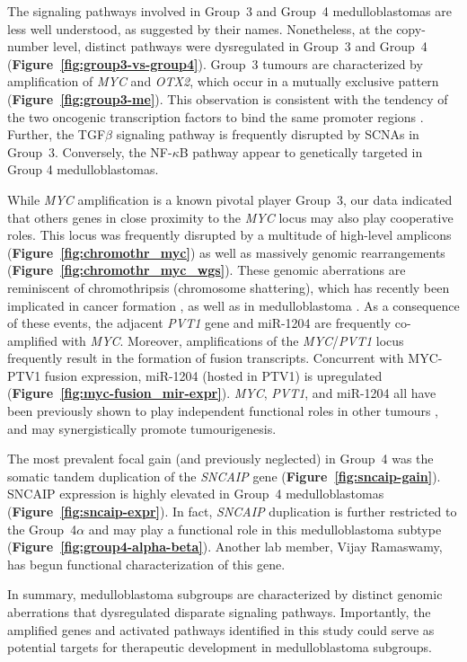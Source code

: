 \documentclass[11pt,letterpaper]{article}
\theoremstyle{definition}
\newcommand{\emphlab}[1]{\textbf{\textsf{#1}}}
\newcommand{\citefig}[1]{\emphlab{Figure~\ref{fig:#1}}}
\begin{document}
The signaling pathways involved in Group~3 and Group~4 medulloblastomas are less well understood, as suggested by their names. Nonetheless, at the copy-number level, distinct pathways were dysregulated in Group~3 and Group~4 (\citefig{group3-vs-group4}). Group~3 tumours are characterized by amplification of \emph{MYC} and \emph{OTX2}, which occur in a mutually exclusive pattern (\citefig{group3-me}). This observation is consistent with the tendency of the two oncogenic transcription factors to bind the same promoter regions . Further, the TGF$\beta$ signaling pathway is frequently disrupted by SCNAs in Group~3. Conversely, the NF-$\kappa$B pathway appear to genetically targeted in Group 4 medulloblastomas.

While \emph{MYC} amplification is a known pivotal player Group~3, our data indicated that others genes in close proximity to the \emph{MYC} locus may also play cooperative roles. This locus was frequently disrupted by a multitude of high-level amplicons (\citefig{chromothr_myc}) as well as massively genomic rearrangements (\citefig{chromothr_myc_wgs}). These genomic aberrations are reminiscent of chromothripsis (chromosome shattering), which has recently been implicated in cancer formation , as well as in medulloblastoma . As a consequence of these events, the adjacent \emph{PVT1} gene and miR-1204 are frequently co-amplified with \emph{MYC}. Moreover, amplifications of the \emph{MYC}/\emph{PVT1} locus frequently result in the formation of fusion transcripts. Concurrent with MYC-PTV1 fusion expression, miR-1204 (hosted in PTV1) is upregulated (\citefig{myc-fusion_mir-expr}). \emph{MYC}, \emph{PVT1}, and miR-1204 all have been previously shown to play independent functional roles in other tumours , and may synergistically promote tumourigenesis.

The most prevalent focal gain (and previously neglected) in Group~4 was the somatic tandem duplication of the \emph{SNCAIP} gene (\citefig{sncaip-gain}). SNCAIP expression is highly elevated in Group~4 medulloblastomas (\citefig{sncaip-expr}). In fact, \emph{SNCAIP} duplication is further restricted to the Group~4$\alpha$ and may play a functional role in this medulloblastoma subtype (\citefig{group4-alpha-beta}). Another lab member, Vijay Ramaswamy, has begun functional characterization of this gene.

In summary, medulloblastoma subgroups are characterized by distinct genomic aberrations that dysregulated disparate signaling pathways. Importantly, the amplified genes and activated pathways identified in this study could serve as potential targets for therapeutic development in medulloblastoma subgroups.
\end{document}
